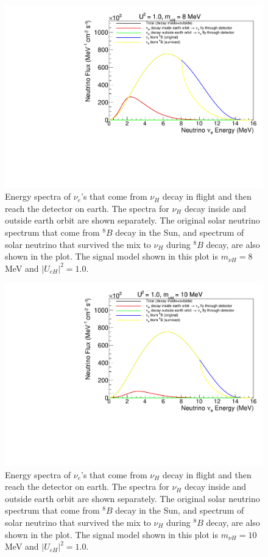 \documentclass[%
 reprint,
 amsmath,amssymb,
 aps,
 prd,
floatfix,
twocolumn,
]{revtex4-1}
\begin{document}
\begin{figure}[!htbp]
\includegraphics[width=0.99\columnwidth]{../plots/DecayInFlightNuLEnergy_U1.0_M8.0_InsideOutside_linXlinY.pdf}
\caption{Energy spectra of $\nu_e$'s that come from $\nu_H$ decay in flight and then reach the detector on earth. The spectra for $\nu_H$ decay inside and outside earth orbit are shown separately. 
The original solar neutrino spectrum that come from $^8 B$ decay in the Sun, and spectrum of solar neutrino that survived the mix to $\nu_H$ during $^{8}B$ decay, are also shown in the plot. The signal model shown in this plot is $m_{\nu H} = 8$ MeV and $|U_{eH}|^2 = 1.0$.}
\label{fig:DecayInFlightSpectrum_U_M8} 
\end{figure}


\begin{figure}[!htbp]
\includegraphics[width=0.99\columnwidth]{../plots/DecayInFlightNuLEnergy_U1.0_M10.0_InsideOutside_linXlinY.pdf}
\caption{Energy spectra of $\nu_e$'s that come from $\nu_H$ decay in flight and then reach the detector on earth. The spectra for $\nu_H$ decay inside and outside earth orbit are shown separately. 
The original solar neutrino spectrum that come from $^8 B$ decay in the Sun, and spectrum of solar neutrino that survived the mix to $\nu_H$ during $^{8}B$ decay, are also shown in the plot. The signal model shown in this plot is $m_{\nu H} = 10$ MeV and $|U_{eH}|^2 = 1.0$.}
\label{fig:DecayInFlightSpectrum_U1_M10} 
\end{figure}
\end{document}

